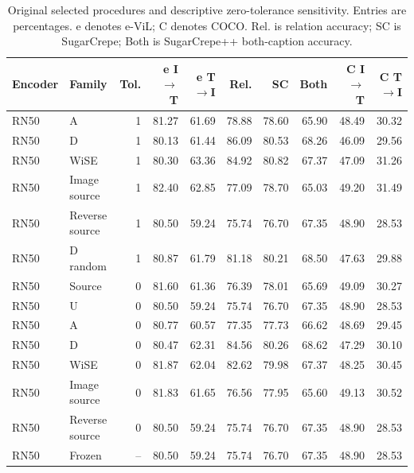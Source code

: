 \begin{table}[t]
\centering
\scriptsize
\setlength{\tabcolsep}{3pt}
\begin{tabular}{llrrrrrrrr}
\toprule
Encoder & Family & Tol. & e I$\to$T & e T$\to$I & Rel. & SC & Both & C I$\to$T & C T$\to$I\\
\midrule
RN50 & A & 1 & 81.27 & 61.69 & 78.88 & 78.60 & 65.90 & 48.49 & 30.32\\
RN50 & D & 1 & 80.13 & 61.44 & 86.09 & 80.53 & 68.26 & 46.09 & 29.56\\
RN50 & WiSE & 1 & 80.30 & 63.36 & 84.92 & 80.82 & 67.37 & 47.09 & 31.26\\
RN50 & Image source & 1 & 82.40 & 62.85 & 77.09 & 78.70 & 65.03 & 49.20 & 31.49\\
RN50 & Reverse source & 1 & 80.50 & 59.24 & 75.74 & 76.70 & 67.35 & 48.90 & 28.53\\
RN50 & D random & 1 & 80.87 & 61.79 & 81.18 & 80.21 & 68.50 & 47.63 & 29.88\\
RN50 & Source & 0 & 81.60 & 61.36 & 76.39 & 78.01 & 65.69 & 49.09 & 30.27\\
RN50 & U & 0 & 80.50 & 59.24 & 75.74 & 76.70 & 67.35 & 48.90 & 28.53\\
RN50 & A & 0 & 80.77 & 60.57 & 77.35 & 77.73 & 66.62 & 48.69 & 29.45\\
RN50 & D & 0 & 80.47 & 62.31 & 84.56 & 80.26 & 68.62 & 47.29 & 30.10\\
RN50 & WiSE & 0 & 81.87 & 62.04 & 82.62 & 79.98 & 67.37 & 48.25 & 30.45\\
RN50 & Image source & 0 & 81.83 & 61.65 & 76.56 & 77.95 & 65.60 & 49.13 & 30.52\\
RN50 & Reverse source & 0 & 80.50 & 59.24 & 75.74 & 76.70 & 67.35 & 48.90 & 28.53\\
RN50 & Frozen & -- & 80.50 & 59.24 & 75.74 & 76.70 & 67.35 & 48.90 & 28.53\\
\bottomrule
\end{tabular}
\caption{Original selected procedures and descriptive zero-tolerance sensitivity. Entries are percentages. e denotes e-ViL; C denotes COCO. Rel. is relation accuracy; SC is SugarCrepe; Both is SugarCrepe++ both-caption accuracy.}\label{tab:originalmetrics18}
\end{table}


